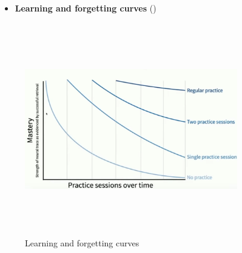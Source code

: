 \documentclass[
  ignorenonframetext,
]{beamer}
\providecommand{\tightlist}{%
  \setlength{\itemsep}{0pt}\setlength{\parskip}{0pt}}\usepackage{longtable,booktabs,array}
\begin{document}
\begin{frame}{}
\label{section-2}
\begin{itemize}
\tightlist
\item
  \textbf{Learning and forgetting curves}
  ()
\end{itemize}

\begin{figure}[H]

{\centering \includegraphics[width=3.64583in,height=3.64583in]{../000_images/002_forgetting_curves.png}

}

\caption{Learning and forgetting curves}

\end{figure}%
\end{frame}
\end{document}
